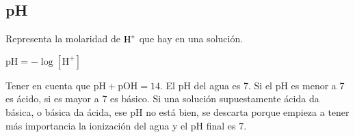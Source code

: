 \subsection*{pH}

Representa la molaridad de $\ce{H^+}$ que hay en una solución.

\hfil$\text{pH} = -\log [\text{H}^+]$\hfil

Tener en cuenta que $\text{pH} + \text{pOH} = 14$. El pH del agua es 7. Si el pH es menor a 7 es ácido, si es mayor a 7 es básico. Si una solución supuestamente ácida da básica, o básica da ácida, ese pH no está bien, se descarta porque empieza a tener más importancia la ionización del agua y el pH final es 7.
